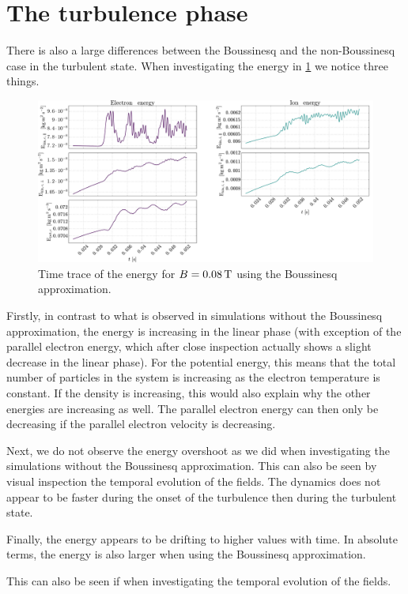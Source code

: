 \section{The turbulence phase}
%
There is also a large differences between the Boussinesq and the non-Boussinesq case in the turbulent state.
When investigating the energy in \cref{fig:energies008B} we notice three things.
%
\begin{figure}[htb]
    \centering
    \includegraphics[width=1.0\textwidth]{fig/results/compareBouss/energies008B}
    \caption{Time trace of the energy for $B=0.08\, \text{T}$ using the Boussinesq approximation.}
    \label{fig:energies008B}
\end{figure}
%
Firstly, in contrast to what is observed in simulations without the Boussinesq approximation, the energy is increasing in the linear phase (with exception of the parallel electron energy, which after close inspection actually shows a slight decrease in the linear phase).
For the potential energy, this means that the total number of particles in the system is increasing as the electron temperature is constant.
If the density is increasing, this would also explain why the other energies are increasing as well.
The parallel electron energy can then only be decreasing if the parallel electron velocity is decreasing.

Next, we do not observe the energy overshoot as we did when investigating the simulations without the Boussinesq approximation.
This can also be seen by visual inspection the temporal evolution of the fields.
The dynamics does not appear to be faster during the onset of the turbulence then during the turbulent state.

Finally, the energy appears to be drifting to higher values with time.
In absolute terms, the energy is also larger when using the Boussinesq approximation.

This can also be seen if when investigating the temporal evolution of the fields.

